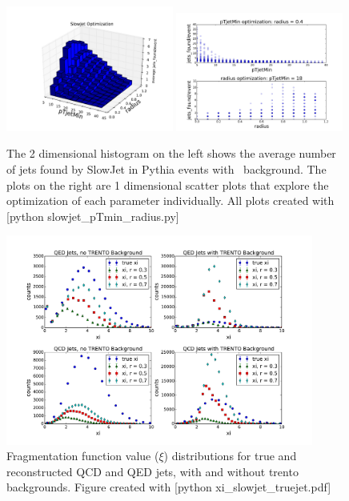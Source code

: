 \documentclass[11pt]{article}
\begin{document}
\begin{figure}[h]
\begin{center}
\includegraphics[width=0.49\textwidth]{slowjet_pTmin_radius1.pdf}
\includegraphics[width=0.49\textwidth]{slowjet_pTmin_radius2.pdf}
\caption{The 2 dimensional histogram on the left shows the average number of jets found by SlowJet in Pythia events with \trento\ background. The plots on the right are 1 dimensional scatter plots that explore the optimization of each parameter individually. All plots created with [python slowjet\_pTmin\_radius.py]}
\label{fig_slowjet_pTmin_radius}
\end{center}
\end{figure}

\begin{figure}[h]
\begin{center}
\includegraphics[width=0.9\textwidth]{xi_slowjet_truejet.pdf}
\caption{Fragmentation function value ($\xi$) distributions for true and reconstructed QCD and QED jets, with and without trento backgrounds.  Figure created with [python xi\_slowjet\_truejet.pdf]}
\label{fig_xi_slowjet_truejet}
\end{center}
\end{figure}
\end{document}
